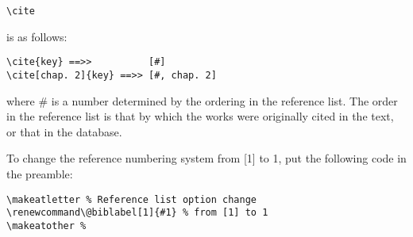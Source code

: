 \documentclass{jib}
\begin{document}
\begin{lstlisting}
\cite 
\end{lstlisting}

is as follows:

\begin{lstlisting}
\cite{key} ==>>          [#]
\cite[chap. 2]{key} ==>> [#, chap. 2]
\end{lstlisting}
  
where \# is a number determined by the ordering in the reference list.
The order in the reference list is that by which the works were originally
  cited in the text, or that in the database.

To change the reference numbering system from [1] to 1,
put the following code in the preamble:

\begin{lstlisting}
\makeatletter % Reference list option change
\renewcommand\@biblabel[1]{#1} % from [1] to 1
\makeatother %
\end{lstlisting}



%
%


\nocite{*}
\end{document}
